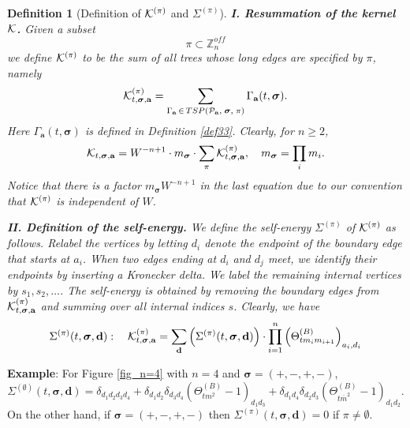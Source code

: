 \documentclass[10pt,reqno]{article}
\renewcommand{\bar}{\overline}
\theoremstyle{plain} %
\newtheorem{definition}[theorem]{Definition}
\theoremstyle{remark}
\numberwithin{equation}{section}
\begin{document}
\begin{definition}[Definition of $\cal K^{(\pi)}$ and $\Sigma^{(\pi)}$]\label{def_Kpi}
\noindent\textbf{I. Resummation of the kernel $\cal K$.}
Given a subset 
 \begin{equation}\label{defpiij}
  \pi \subset \mathbb Z_n^{off} 
 \end{equation}
we define ${\cal K}^{(\pi)}$ to be the sum of all trees whose long edges are specified by $\pi$, namely
 \begin{equation} 
     {\cal K}^{(\pi)}_{t, \boldsymbol{\sigma}, \textbf{a}} = \sum_{\Gamma_{\textbf{a}}\, \in\,  {TSP}({\cal P}_{\textbf{a}},\; \boldsymbol{\sigma},\; \pi )} \Gamma_{ \textbf{a}}(t, \boldsymbol{\sigma}).
   \end{equation} 
Here $\Gamma_{ \textbf{a}}(t, \boldsymbol{\sigma})$ is defined in Definition \ref{def33}.
Clearly, for $n\ge 2$, 
\begin{equation}\label{KKpi}
  {\cal K}_{t, \boldsymbol{\sigma}, \textbf{a}} =W^{-n+1}\cdot m_{\boldsymbol{\sigma}}\cdot \sum_{\pi}{\cal K}_{t, \boldsymbol{\sigma}, \textbf{a}} ^{(\pi)},\quad m_{\boldsymbol{\sigma}}=\prod_i m_i. 
\end{equation}
Notice that there is a factor $m_{\boldsymbol{\sigma}}W^{-n+1}$ in the last equation due to our convention that $\cal K^{(\pi)}$ is independent of $W$. 

\noindent\textbf{II. Definition of the self-energy.}
We define the self-energy $\Sigma^{(\pi)}$ of ${\cal K}^{(\pi)}$ as follows. Relabel the vertices by letting $d_i$ denote the endpoint of the boundary edge that starts at $a_i$.
When two edges ending at $d_i$ and $d_j$ meet, we identify their endpoints by inserting a Kronecker delta. We label the remaining internal vertices by $s_1,s_2,\ldots$.
The self-energy is obtained by removing the boundary edges from ${\cal K}^{(\pi)}_{t, \boldsymbol{\sigma}, \textbf{a}}$ and summing over all internal indices $s$.
Clearly, we have 
\begin{equation} 
\Sigma^{(\pi)}(t, \boldsymbol{\sigma}, \textbf{d}): 
\quad  
{\cal K}^{(\pi)}_{t, \boldsymbol{\sigma}, \textbf{a}}
=
\sum_{\textbf{d}}\left(\Sigma^{(\pi)}(t, \boldsymbol{\sigma}, \textbf{d})\right)
\cdot 
\prod_{i=1}^n \left(\Theta^{(B)}_{tm_im_{i+1}}\right)_{a_i, d_i}   
\end{equation} 
\end{definition}
 

\noindent 
{\bf Example}: For Figure \ref{fig_n=4} with $n=4$ and 
$\boldsymbol{\sigma}=(+,-,+,-) $, 
$$
\Sigma^{(\emptyset)}(t, \boldsymbol{\sigma}, \textbf{d}) = \delta_{d_1 d_2 d_3 d_4}
+ \delta_{d_1 d_2} \delta_{d_3 d_4} \left(\Theta^{(B)}_{t m^2} - 1\right)_{d_1 d_3}
+ \delta_{d_1 d_4} \delta_{d_2 d_3} \left(\Theta^{(B)}_{t \bar m^2} - 1\right)_{d_1 d_2}.
$$
On the other hand, if  $\boldsymbol{\sigma}=(+,-,+,-)$  then 
$\Sigma^{(\pi)}(t, \boldsymbol{\sigma}, \textbf{d})=0$ if $\pi\ne \emptyset$.
\end{document}
